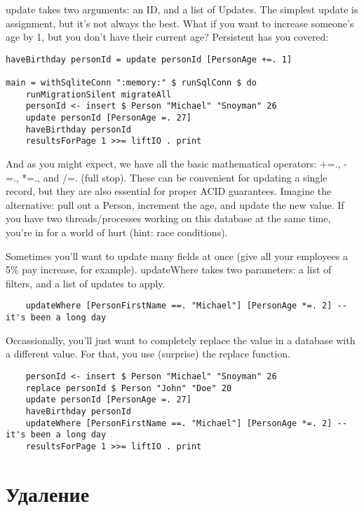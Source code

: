 update takes two arguments: an ID, and a list of Updates. The simplest update is assignment, but it's not always the best. What if you want to increase someone's age by 1, but you don't have their current age? Persistent has you covered:

\begin{lstlisting}
haveBirthday personId = update personId [PersonAge +=. 1]

main = withSqliteConn ":memory:" $ runSqlConn $ do
    runMigrationSilent migrateAll
    personId <- insert $ Person "Michael" "Snoyman" 26
    update personId [PersonAge =. 27]
    haveBirthday personId
    resultsForPage 1 >>= liftIO . print
\end{lstlisting}%

And as you might expect, we have all the basic mathematical operators: +=., -=., *=., and /=. (full stop). These can be convenient for updating a single record, but they are also essential for proper ACID guarantees. Imagine the alternative: pull out a Person, increment the age, and update the new value. If you have two threads/processes working on this database at the same time, you're in for a world of hurt (hint: race conditions).

Sometimes you'll want to update many fields at once (give all your employees a 5\% pay increase, for example). updateWhere takes two parameters: a list of filters, and a list of updates to apply.

\begin{lstlisting}
    updateWhere [PersonFirstName ==. "Michael"] [PersonAge *=. 2] -- it's been a long day
\end{lstlisting}

Occassionally, you'll just want to completely replace the value in a database with a different value. For that, you use (surprise) the replace function.

\begin{lstlisting}
    personId <- insert $ Person "Michael" "Snoyman" 26
    replace personId $ Person "John" "Doe" 20
    update personId [PersonAge =. 27]
    haveBirthday personId
    updateWhere [PersonFirstName ==. "Michael"] [PersonAge *=. 2] -- it's been a long day
    resultsForPage 1 >>= liftIO . print
\end{lstlisting}%

\section{Удаление} %

